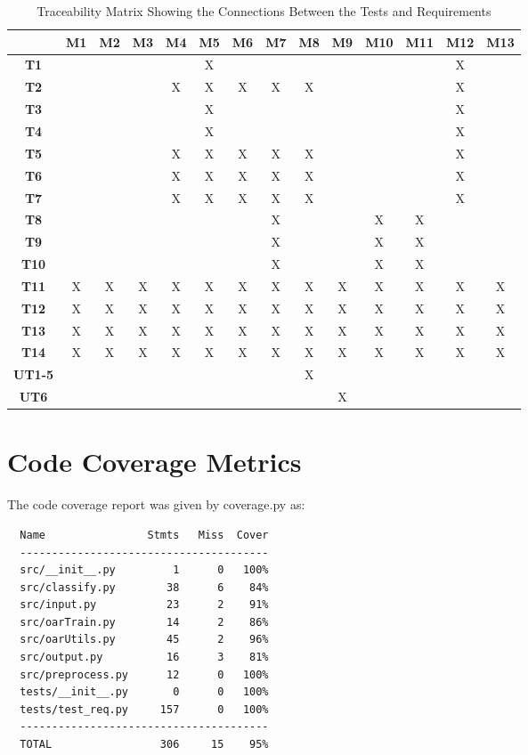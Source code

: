 \documentclass[12pt, titlepage]{article}
\begin{document}
\begin{table}[h!]
  \centering
  \begin{tabular}{|c|c|c|c|c|c|c|c|c|c|c|c|c|c|}
  \hline
    & M1
    & M2
    & M3
    & M4
    & M5
    & M6
    & M7
    & M8
    & M9
    & M10
    & M11
    & M12
    & M13
  \\ \hline
  \textbf{T1}            & & & & &X& & & & & & &X& \\ \hline
  \textbf{T2}            & & & &X&X&X&X&X& & & &X& \\ \hline
  \textbf{T3}           & & & & &X& & & & & & &X& \\ \hline
  \textbf{T4}             & & & & &X& & & & & & &X& \\ \hline
  \textbf{T5}           & & & &X&X&X&X&X& & & &X& \\ \hline
  \textbf{T6}           & & & &X&X&X&X&X& & & &X& \\ \hline
  \textbf{T7}           & & & &X&X&X&X&X& & & &X& \\ \hline
  \textbf{T8}              & & & & & & &X& & &X&X& & \\ \hline
  \textbf{T9}              & & & & & & &X& & &X&X& & \\ \hline
  \textbf{T10}             & & & & & & &X& & &X&X& & \\ \hline
  \textbf{T11}      &X&X&X&X&X&X&X&X&X&X&X&X&X\\ \hline
  \textbf{T12}               &X&X&X&X&X&X&X&X&X&X&X&X&X\\ \hline
  \textbf{T13}              &X&X&X&X&X&X&X&X&X&X&X&X&X\\ \hline
  \textbf{T14}           &X&X&X&X&X&X&X&X&X&X&X&X&X\\ \hline
  \textbf{UT1-5}                & & & & & & & &X& & & & & \\ \hline
  \textbf{UT6}                  & & & & & & & & &X& & & & \\ \hline
  \end{tabular}
  \caption{Traceability Matrix Showing the Connections Between the Tests and Requirements}
  \label{Table:B_trace}
\end{table}

\section{Code Coverage Metrics}

The code coverage report was given by coverage.py as:

\begin{verbatim}
  Name                Stmts   Miss  Cover
  ---------------------------------------
  src/__init__.py         1      0   100%
  src/classify.py        38      6    84%
  src/input.py           23      2    91%
  src/oarTrain.py        14      2    86%
  src/oarUtils.py        45      2    96%
  src/output.py          16      3    81%
  src/preprocess.py      12      0   100%
  tests/__init__.py       0      0   100%
  tests/test_req.py     157      0   100%
  ---------------------------------------
  TOTAL                 306     15    95%
\end{verbatim}
\end{document}
